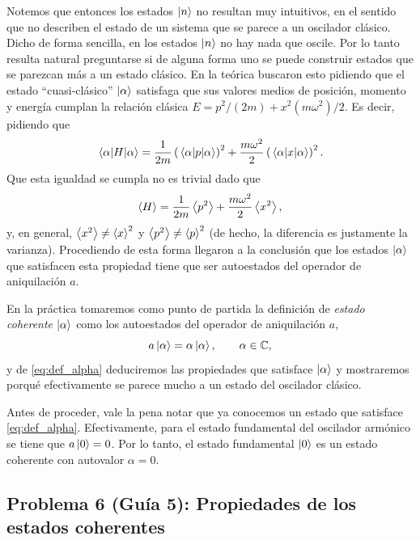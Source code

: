 \documentclass[10pt, a4paper]{article}
\numberwithin{equation}{subsection}
\begin{document}
Notemos que entonces los estados $\ket{n}$ no resultan muy intuitivos, en el
sentido que no describen el estado de un sistema que se parece a un oscilador
clásico. Dicho de forma sencilla, en los estados $\ket{n}$ no hay nada que
oscile. Por lo tanto resulta natural preguntarse si de alguna forma uno se
puede construir estados que se parezcan más a un estado clásico. En la
teórica buscaron esto pidiendo que el estado ``cuasi-clásico'' $\ket{\alpha}$
satisfaga que sus valores medios de posición, momento y energía cumplan la
relación clásica $E = p^2/(2m) + x^2(m\omega^2)/2$. Es decir, pidiendo que
\begin{equation}
  \expval{H}{\alpha} = \frac{1}{2m}\left(\expval{p}{\alpha}\right)^2 +
    \frac{m\omega^2}{2}\left(\expval{x}{\alpha}\right)^2.
\end{equation}
Que esta igualdad se cumpla no es trivial dado que
\begin{equation}
  \expval{H} = \frac{1}{2m}\expval{p^2} + \frac{m\omega^2}{2}\expval{x^2},
\end{equation}
y, en general, $\expval{x^2} \neq \expval{x}^2$ y $\expval{p^2} \neq
\expval{p}^2$ (de hecho, la diferencia es justamente la varianza).
Procediendo de esta forma llegaron a la conclusión que los estados
$\ket{\alpha}$ que satisfacen esta propiedad tiene que ser autoestados del
operador de aniquilación $a$.

\bigbreak

En la práctica tomaremos como punto de partida la definición de \emph{estado
coherente} $\ket{\alpha}$ como los autoestados del operador de aniquilación
$a$,
\begin{equation} \label{eq:def_alpha}
  a\ket{\alpha} = \alpha\ket{\alpha}, \qquad \alpha\in\mathbb{C},
\end{equation}
y de \eqref{eq:def_alpha} deduciremos las propiedades que satisface
$\ket{\alpha}$ y mostraremos porqué efectivamente se parece mucho a un estado
del oscilador clásico.

Antes de proceder, vale la pena notar que ya conocemos un estado que satisface
\eqref{eq:def_alpha}. Efectivamente, para el estado fundamental del oscilador
armónico se tiene que $a\ket{0} = 0$. Por lo tanto, el estado fundamental
$\ket{0}$ es un estado coherente con autovalor $\alpha = 0$.

\subsection{Problema 6 (Guía 5): Propiedades de los estados coherentes}
\end{document}
